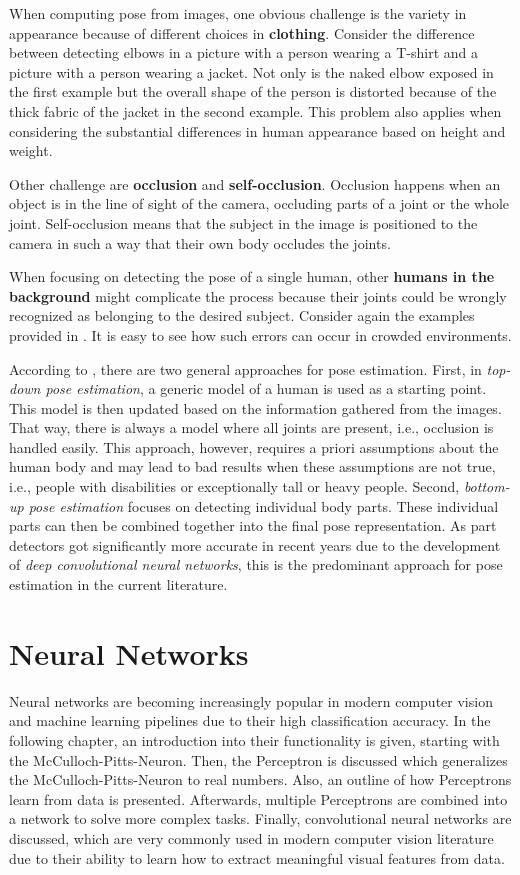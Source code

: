 When computing pose from images, one obvious challenge is the variety in appearance because of different choices in \textbf{clothing}.
Consider the difference between detecting elbows in a picture with a person wearing a T-shirt and a picture with a person wearing a jacket.
Not only is the naked elbow exposed in the first example but the overall shape of the person is distorted because of the thick fabric of the jacket in the second example.
This problem also applies when considering the substantial differences in human appearance based on height and weight.

Other challenge are \textbf{occlusion} and \textbf{self-occlusion}. Occlusion happens when an object is in the line of sight of the camera, occluding parts of a joint or the whole joint.
Self-occlusion means that the subject in the image is positioned to the camera in such a way that their own body occludes the joints.

When focusing on detecting the pose of a single human, other \textbf{humans in the background} might complicate the process because their joints could be wrongly recognized as belonging to the desired subject.
Consider again the examples provided in .
It is easy to see how such errors can occur in crowded environments.

According to \cite{zhu_articulated_2016}, there are two general approaches for pose estimation.
First, in \textit{top-down pose estimation}, a generic model of a human is used as a starting point.
This model is then updated based on the information gathered from the images.
That way, there is always a model where all joints are present, i.e., occlusion is handled easily.
This approach, however, requires a priori assumptions about the human body and may lead to bad results when these assumptions are not true, i.e., people with disabilities or exceptionally tall or heavy people.
Second, \textit{bottom-up pose estimation} focuses on detecting individual body parts.
These individual parts can then be combined together into the final pose representation.
As part detectors got significantly more accurate in recent years due to the development of \textit{deep convolutional neural networks}, this is the predominant approach for pose estimation in the current literature.


\section{Neural Networks}
\label{sec:neural_networks}
Neural networks are becoming increasingly popular in modern computer vision and machine learning pipelines due to their high classification accuracy.
In the following chapter, an introduction into their functionality is given, starting with the McCulloch-Pitts-Neuron.
Then, the Perceptron is discussed which generalizes the McCulloch-Pitts-Neuron to real numbers.
Also, an outline of how Perceptrons learn from data is presented.
Afterwards, multiple Perceptrons are combined into a network to solve more complex tasks.
Finally, convolutional neural networks are discussed, which are very commonly used in modern computer vision literature due to their ability to learn how to extract meaningful visual features from data.

